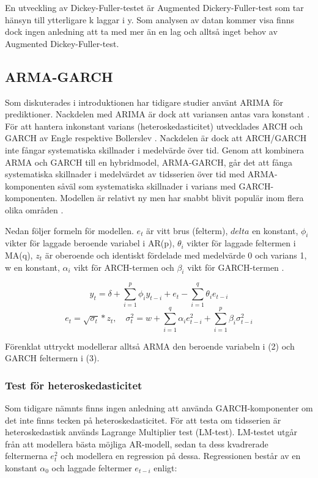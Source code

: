 \documentclass[12pt]{article}
\begin{document}
En utveckling av Dickey-Fuller-testet är Augmented Dickery-Fuller-test som tar hänsyn till ytterligare k laggar i y. Som analysen av datan kommer visa finns dock ingen anledning att ta med mer än en lag och alltså inget behov av Augmented Dickey-Fuller-test.


\subsection{ARMA-GARCH}
Som diskuterades i introduktionen har tidigare studier använt ARIMA för prediktioner. Nackdelen med ARIMA är dock att variansen antas vara konstant \parencite{montgomery2015forecasting}. För att hantera inkonstant varians (heteroskedasticitet) utvecklades ARCH och GARCH av Engle \parencite*{engle1982autoregressive} respektive Bollerslev \parencite*{bollerslev1986generalized}. Nackdelen är dock att ARCH/GARCH inte fångar systematiska skillnader i medelvärde över tid. Genom att kombinera ARMA och GARCH till en hybridmodel, ARMA-GARCH, går det att fånga systematiska skillnader i medelvärdet av tidsserien över tid med ARMA-komponenten såväl som systematiska skillnader i varians med GARCH-komponenten. Modellen är relativt ny men har snabbt blivit populär inom flera olika områden \parencite{chen2011short}.\par 

Nedan följer formeln för modellen. \(e_t\) är vitt brus (felterm), \(delta\) en konstant, \(\phi_i\) vikter för laggade beroende variabel i AR(p), \(\theta_i\) vikter för laggade feltermen i MA(q), \(z_t\) är oberoende och identiskt fördelade med medelvärde 0 och varians 1, w en konstant, \(\alpha_i\) vikt för ARCH-termen och \(\beta_i\) vikt för GARCH-termen \parencites{bollerslev1986generalized}{montgomery2015forecasting}.

\begin{equation}
    y_t = \delta + \sum_{i=1}^{p}\phi_iy_{t-i}  +e_t - \sum_{i=1}^{q}\theta_i e_{t-i} 
\end{equation}
\begin{equation}
    e_t=\sqrt{\sigma_t}*z_t,\quad \sigma^2_t=w + \sum_{i=1}^{q}\alpha_i e^2_{t-i} + \sum_{i=1}^{p}\beta_i \sigma^2_{t-i}
\end{equation}

Förenklat uttryckt modellerar alltså ARMA den beroende variabeln i (2) och GARCH feltermern i (3).

\subsubsection{Test för heteroskedasticitet}
Som tidigare nämnts finns ingen anledning att använda GARCH-komponenter om det inte finns tecken på heteroskedasticitet. För att testa om tidsserien är heteroskedastisk används Lagrange Multiplier test (LM-test). LM-testet utgår från att modellera bästa möjliga AR-modell, sedan ta dess kvadrerade feltermerna \(e_t^2\) och modellera en regression på dessa. Regressionen består av en konstant \(\alpha_0\) och laggade feltermer \(e_{t-i}\) enligt:
\end{document}
